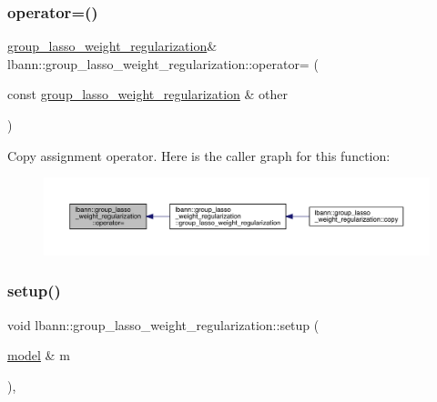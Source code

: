 \subsubsection{\texorpdfstring{operator=()}{operator=()}}
{\footnotesize\ttfamily \hyperlink{classlbann_1_1group__lasso__weight__regularization}{group\+\_\+lasso\+\_\+weight\+\_\+regularization}\& lbann\+::group\+\_\+lasso\+\_\+weight\+\_\+regularization\+::operator= (\begin{DoxyParamCaption}\item[{const \hyperlink{classlbann_1_1group__lasso__weight__regularization}{group\+\_\+lasso\+\_\+weight\+\_\+regularization} \&}]{other }\end{DoxyParamCaption})\hspace{0.3cm}{\ttfamily [default]}}

Copy assignment operator. Here is the caller graph for this function\+:\nopagebreak
\begin{figure}[H]
\begin{center}
\leavevmode
\includegraphics[width=350pt]{classlbann_1_1group__lasso__weight__regularization_aaf1af923c624618ab823c7ac73bc4333_icgraph}
\end{center}
\end{figure}
\mbox{\label{classlbann_1_1group__lasso__weight__regularization_af413161b1feefa3bb472079635547c57}} 
\subsubsection{\texorpdfstring{setup()}{setup()}}
{\footnotesize\ttfamily void lbann\+::group\+\_\+lasso\+\_\+weight\+\_\+regularization\+::setup (\begin{DoxyParamCaption}\item[{\hyperlink{classlbann_1_1model}{model} \&}]{m }\end{DoxyParamCaption})\hspace{0.3cm}{\ttfamily [override]}, {\ttfamily [virtual]}}

